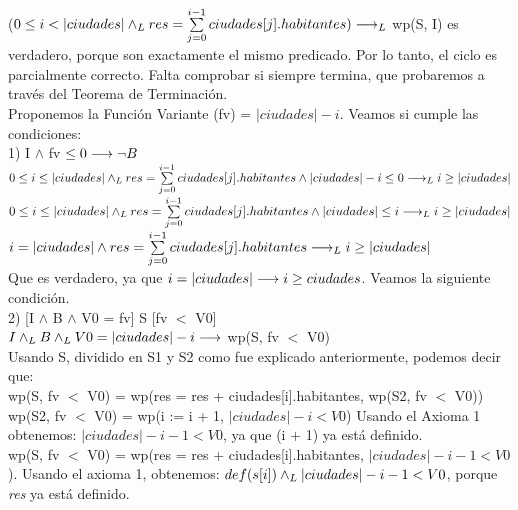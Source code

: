 \documentclass[10pt,a4paper]{article}
\begin{document}
    ($0 \leq i < |ciudades| \land _L res = \sum\limits_{j=0}^{i - 1}ciudades[j].habitantes) \longrightarrow _L$ wp(S, I) es verdadero, porque son exactamente el mismo predicado. Por lo tanto, el ciclo es parcialmente correcto. Falta comprobar si siempre termina, que probaremos a través del Teorema de Terminación.\\
    
    Proponemos la Función Variante (fv) = $|ciudades| - i$. Veamos si cumple las condiciones:\\

    1) I $\wedge$ fv $\leq 0  \longrightarrow \neg B$\\

    $0 \leq i \leq |ciudades| \land _L res = \sum\limits_{j=0}^{i - 1}ciudades[j].habitantes \wedge |ciudades| - i \leq 0 \longrightarrow _L i \geq |ciudades|$ \\
    
    $0 \leq i \leq |ciudades| \land _L res = \sum\limits_{j=0}^{i - 1}ciudades[j].habitantes \wedge |ciudades| \leq i \longrightarrow _L i \geq |ciudades|$ \\

    $i = |ciudades| \wedge  res = \sum\limits_{j=0}^{i - 1}ciudades[j].habitantes \longrightarrow _L i \geq |ciudades|$\\

    Que es verdadero, ya que $i = |ciudades| \longrightarrow i \geq ciudades$. Veamos la siguiente condición.\\

    2) [I $\wedge$ B $\wedge$ V0 = fv] S [fv $<$ V0]\\

    $I \land _L B \land _L V0 = |ciudades| - i \longrightarrow$ wp(S, fv $<$ V0)\\
    
    Usando S, dividido en S1 y S2 como fue explicado anteriormente, podemos decir que:\\
    
    wp(S, fv $<$ V0) = wp(res = res + ciudades[i].habitantes, wp(S2, fv $<$ V0))\\

    wp(S2, fv $<$ V0) = wp(i := i + 1, $|ciudades| - i < V0$) Usando el Axioma 1 obtenemos: $|ciudades| - i - 1 < V0$, ya que (i + 1) ya está definido.\\

    wp(S, fv $<$ V0) = wp(res = res + ciudades[i].habitantes, $|ciudades| - i - 1 < V0$). Usando el axioma 1, obtenemos: $def (s[i]) \land _L |ciudades| - i - 1 < V0$, porque \textit{res} ya está definido.\\
\end{document}
